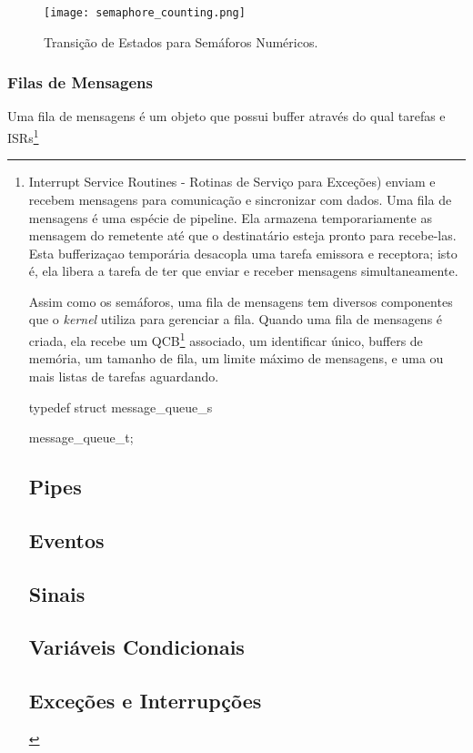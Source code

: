\begin{figure}[htb]
	\centering
	\texttt{[image: semaphore\_counting.png]}
	\caption{Transição de Estados para Semáforos Numéricos.}
	\label{fig:semaphore_mutex}
\end{figure}

\subsubsection{Filas de Mensagens}

Uma fila de mensagens é um objeto que possui buffer através do qual tarefas e ISRs\footnote{Interrupt Service Routines - Rotinas de Serviço para Exceções) enviam e recebem mensagens para comunicação e sincronizar com dados. Uma fila de mensagens é uma espécie de pipeline. Ela armazena temporariamente as mensagem do remetente até que o destinatário esteja pronto para recebe-las. Esta bufferizaçao temporária desacopla uma tarefa emissora e receptora; isto é, ela libera a tarefa de ter que enviar e receber mensagens simultaneamente.

Assim como os semáforos, uma fila de mensagens tem diversos componentes que o \emph{kernel} utiliza para gerenciar a fila. Quando uma fila de mensagens é criada, ela recebe um QCB\footnote{Queue Control Block - Bloco de Controle de Fila} associado, um identificar único, buffers de memória, um tamanho de fila, um limite máximo de mensagens, e uma ou mais listas de tarefas aguardando.

typedef struct message_queue_s {

} message_queue_t;

\subsection{Pipes}

\subsection{Eventos}
\subsection{Sinais}
\subsection{Variáveis Condicionais}

\subsection{Exceções e Interrupções}

}
